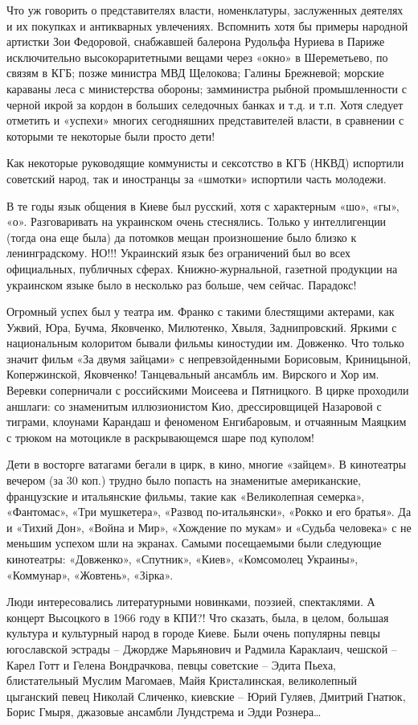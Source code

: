 Что уж говорить о представителях власти, номенклатуры, заслуженных деятелях и
их покупках и антикварных увлечениях. Вспомнить хотя бы примеры народной
артистки Зои Федоровой, снабжавшей балерона Рудольфа Нуриева в Париже
исключительно высокораритетными вещами через «окно» в Шереметьево, по связям в
КГБ; позже министра МВД Щелокова; Галины Брежневой; морские караваны леса с
министерства обороны; замминистра рыбной промышленности с черной икрой за
кордон в больших селедочных банках и т.д. и т.п. Хотя следует отметить и
«успехи» многих сегодняшних представителей власти, в сравнении с которыми те
некоторые были просто дети! 

Как некоторые руководящие коммунисты и сексотство в КГБ (НКВД) испортили
советский народ, так и иностранцы за «шмотки» испортили часть молодежи.

В те годы язык общения в Киеве был русский, хотя с характерным «шо», «гы», «о».
Разговаривать на украинском очень стеснялись. Только у интеллигенции (тогда она
еще была) да потомков мещан произношение было близко к ленинградскому. НО!!!
Украинский язык без ограничений был во всех официальных, публичных сферах.
Книжно-журнальной, газетной продукции на украинском языке было в несколько раз
больше, чем сейчас. Парадокс!

Огромный успех был у театра им. Франко с такими блестящими актерами, как Ужвий,
Юра, Бучма, Яковченко, Милютенко, Хвыля, Заднипровский. Яркими с национальным
колоритом бывали фильмы киностудии им. Довженко. Что только значит фильм «За
двумя зайцами» с непревзойденными Борисовым, Криницыной, Копержинской,
Яковченко! Танцевальный ансамбль им. Вирского и Хор им. Веревки соперничали с
российскими Моисеева и Пятницкого. В цирке проходили аншлаги: со знаменитым
иллюзионистом Кио, дрессировщицей Назаровой с тиграми, клоунами Карандаш и
феноменом Енгибаровым, и отчаянным Маяцким с трюком на мотоцикле в
раскрывающемся шаре под куполом! 

Дети в восторге ватагами бегали в цирк, в кино, многие «зайцем». В кинотеатры
вечером (за 30 коп.) трудно было попасть на знаменитые американские,
французские и итальянские фильмы, такие как «Великолепная семерка», «Фантомас»,
«Три мушкетера», «Развод по-итальянски», «Рокко и его братья». Да и «Тихий
Дон», «Война и Мир», «Хождение по мукам» и «Судьба человека» с не меньшим
успехом шли на экранах. Самыми посещаемыми были следующие кинотеатры:
«Довженко», «Спутник», «Киев», «Комсомолец Украины», «Коммунар», «Жовтень»,
«Зірка». 

Люди интересовались литературными новинками, поэзией, спектаклями. А концерт
Высоцкого в 1966 году в КПИ?! Что сказать, была, в целом, большая культура и
культурный народ в городе Киеве. Были очень популярны певцы югославской эстрады
– Джордже Марьянович и Радмила Караклаич, чешской – Карел Готт и Гелена
Вондрачкова, певцы советские – Эдита Пьеха, блистательный Муслим Магомаев, Майя
Кристалинская, великолепный цыганский певец Николай Сличенко, киевские – Юрий
Гуляев, Дмитрий Гнатюк, Борис Гмыря, джазовые ансамбли Лундстрема и Эдди
Рознера…

